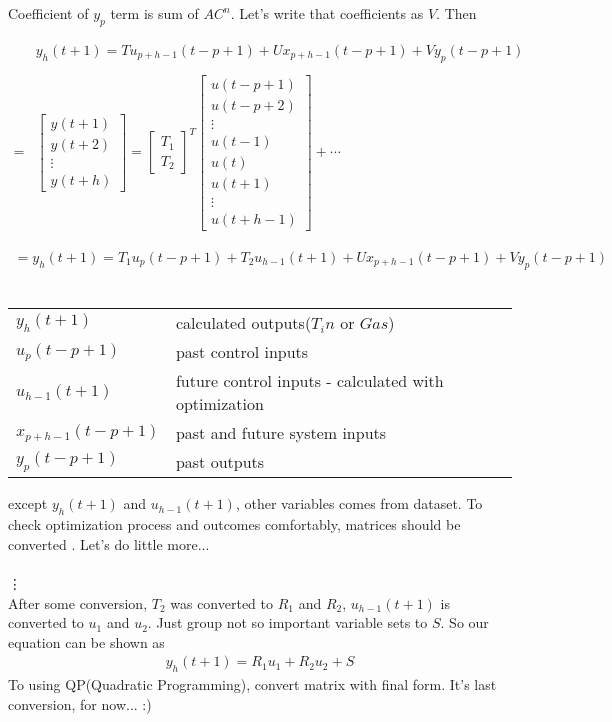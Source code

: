 \documentclass{article}
\makeatletter
\newenvironment{conditions}
{\par\vspace{\abovedisplayskip}\noindent\begin{tabular}{>{$}l<{$} @{${}={}$} l}}
{\end{tabular}\par\vspace{\belowdisplayskip}}
\makeatother
\begin{document}
Coefficient of $y_p$ term is sum of $AC^{n}$. Let's write that coefficients as $V$. Then 


\begin{align*}
	&y_h(t+1) = Tu_{p+h-1}(t-p+1) + Ux_{p+h-1}(t-p+1) + Vy_p(t-p+1)\\\\
	=&\begin{bmatrix}
		y(t+1)\\
		y(t+2)\\
		\vdots\\
		y(t+h)
	\end{bmatrix}
	= 
	\begin{bmatrix}
	T_1\\
	T_2
	\end{bmatrix}^T
	\begin{bmatrix}
		u(t-p+1)\\
		u(t-p+2)\\
		\vdots\\
		u(t-1)\\
		u(t)\\
		\hline
		u(t+1)\\
		\vdots\\
		u(t+h-1)
	\end{bmatrix}
	+
	\cdots
\end{align*}



\begin{align*}
	=y_h(t+1) = T_1u_p(t-p+1)+ T_2u_{h-1}(t+1) + Ux_{p+h-1}(t-p+1) + Vy_p(t-p+1)
\end{align*}
\\
\begin{conditions}
y_h(t+1)	&	calculated outputs($T_in$ or $Gas$)\\
u_p(t-p+1) & past control inputs\\
u_{h-1}(t+1) & future control inputs - calculated with optimization\\
x_{p+h-1}(t-p+1) & past and future system inputs\\
y_p(t-p+1) & past outputs
\end{conditions}

except $y_h(t+1)$ and $u_{h-1}(t+1)$, other variables comes from dataset.
To check optimization process and outcomes comfortably, matrices should be converted . Let's do little more...\\\\
\vdots\\

After some conversion, $T_2$ was converted to $R_1$ and $R_2$, $u_{h-1}(t+1)$ is converted to $u_1$ and $u_2$. Just group not so important variable sets to $S$. So our equation can be shown as 
\begin{align}\label{eq:4}
	y_h(t+1) = R_1u_1 + R_2u_2 + S
\end{align}
To using QP(Quadratic Programming), convert matrix with final form. It's last conversion, for now... :)
\end{document}
